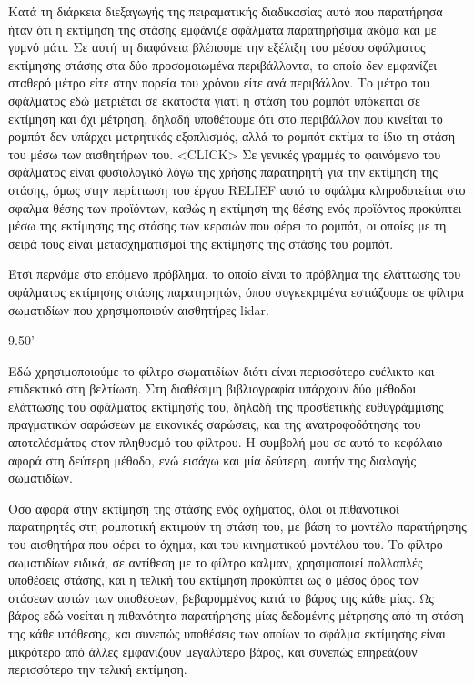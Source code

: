 \documentclass[a4paper,10pt]{article}
\begin{document}
Κατά τη διάρκεια διεξαγωγής της πειραματικής διαδικασίας αυτό που παρατήρησα
ήταν ότι η εκτίμηση της στάσης εμφάνιζε σφάλματα παρατηρήσιμα ακόμα και με
γυμνό μάτι. Σε αυτή τη διαφάνεια βλέπουμε την εξέλιξη του μέσου σφάλματος
εκτίμησης στάσης στα δύο προσομοιωμένα περιβάλλοντα, το οποίο δεν εμφανίζει
σταθερό μέτρο είτε στην πορεία του χρόνου είτε ανά περιβάλλον.  Το μέτρο του
σφάλματος εδώ μετριέται σε εκατοστά γιατί η στάση του ρομπότ υπόκειται σε
εκτίμηση και όχι μέτρηση, δηλαδή υποθέτουμε ότι στο περιβάλλον που κινείται το
ρομπότ δεν υπάρχει μετρητικός εξοπλισμός, αλλά το ρομπότ εκτίμα το ίδιο τη
στάση του μέσω των αισθητήρων του.
<CLICK>
Σε γενικές γραμμές το φαινόμενο του σφάλματος είναι φυσιολογικό λόγω της χρήσης
παρατηρητή για την εκτίμηση της στάσης, όμως στην περίπτωση του έργου RELIEF
αυτό το σφάλμα κληροδοτείται στο σφαλμα θέσης των προϊόντων, καθώς η εκτίμηση
της θέσης ενός προϊόντος προκύπτει μέσω της εκτίμησης της στάσης των κεραιών
που φέρει το ρομπότ, οι οποίες με τη σειρά τους είναι μετασχηματισμοί
της εκτίμησης της στάσης του ρομπότ.

Έτσι περνάμε στο επόμενο πρόβλημα, το οποίο είναι το πρόβλημα της ελάττωσης του
σφάλματος εκτίμησης στάσης παρατηρητών, όπου συγκεκριμένα εστιάζουμε σε φίλτρα
σωματιδίων που χρησιμοποιούν αισθητήρες lidar.

9.50'



Εδώ χρησιμοποιούμε το φίλτρο σωματιδίων διότι είναι περισσότερο ευέλικτο και
επιδεκτικό στη βελτίωση. Στη διαθέσιμη βιβλιογραφία υπάρχουν δύο μέθοδοι
ελάττωσης του σφάλματος εκτίμησής του, δηλαδή της προσθετικής ευθυγράμμισης
πραγματικών σαρώσεων με εικονικές σαρώσεις, και της ανατροφοδότησης του
αποτελέσμάτος στον πληθυσμό του φίλτρου. Η συμβολή μου σε αυτό το κεφάλαιο
αφορά στη δεύτερη μέθοδο, ενώ εισάγω και μία δεύτερη, αυτήν της διαλογής
σωματιδίων.

Όσο αφορά στην εκτίμηση της στάσης ενός οχήματος, όλοι οι πιθανοτικοί
παρατηρητές στη ρομποτική εκτιμούν τη στάση του, με βάση το μοντέλο παρατήρησης
του αισθητήρα που φέρει το όχημα, και του κινηματικού μοντέλου του. Το φίλτρο
σωματιδίων ειδικά, σε αντίθεση με το φίλτρο καλμαν, χρησιμοποιεί πολλαπλές
υποθέσεις στάσης, και η τελική του εκτίμηση προκύπτει ως ο μέσος όρος των
στάσεων αυτών των υποθέσεων, βεβαρυμμένος κατά το βάρος της κάθε μίας. Ως βάρος
εδώ νοείται η πιθανότητα παρατήρησης μίας δεδομένης μέτρησης από τη στάση της
κάθε υπόθεσης, και συνεπώς υποθέσεις των οποίων το σφάλμα εκτίμησης είναι
μικρότερο από άλλες εμφανίζουν μεγαλύτερο βάρος, και συνεπώς επηρεάζουν
περισσότερο την τελική εκτίμηση.
\end{document}
